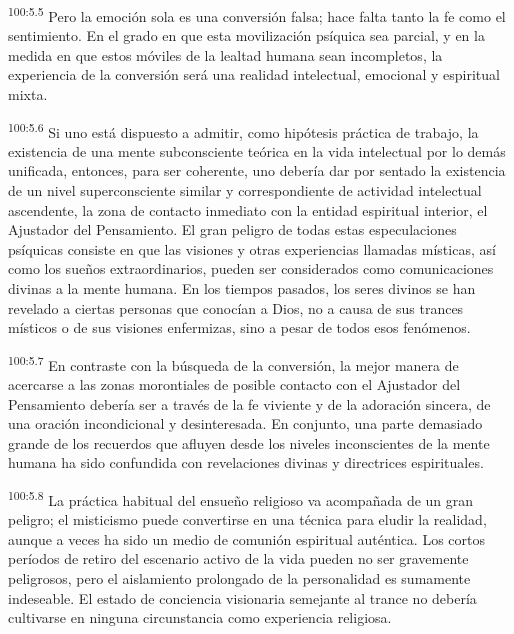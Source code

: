 \documentclass[twoside, 11pt]{book}
\begin{document}
\par
\textsuperscript{100:5.5} Pero la emoción sola es una conversión falsa; hace falta tanto la fe como el sentimiento. En el grado en que esta movilización psíquica sea parcial, y en la medida en que estos móviles de la lealtad humana sean incompletos, la experiencia de la conversión será una realidad intelectual, emocional y espiritual mixta.

\par
\textsuperscript{100:5.6} Si uno está dispuesto a admitir, como hipótesis práctica de trabajo, la existencia de una mente subconsciente teórica en la vida intelectual por lo demás unificada, entonces, para ser coherente, uno debería dar por sentado la existencia de un nivel superconsciente similar y correspondiente de actividad intelectual ascendente, la zona de contacto inmediato con la entidad espiritual interior, el Ajustador del Pensamiento. El gran peligro de todas estas especulaciones psíquicas consiste en que las visiones y otras experiencias llamadas místicas, así como los sueños extraordinarios, pueden ser considerados como comunicaciones divinas a la mente humana. En los tiempos pasados, los seres divinos se han revelado a ciertas personas que conocían a Dios, no a causa de sus trances místicos o de sus visiones enfermizas, sino a pesar de todos esos fenómenos.

\par
\textsuperscript{100:5.7} En contraste con la búsqueda de la conversión, la mejor manera de acercarse a las zonas morontiales de posible contacto con el Ajustador del Pensamiento debería ser a través de la fe viviente y de la adoración sincera, de una oración incondicional y desinteresada. En conjunto, una parte demasiado grande de los recuerdos que afluyen desde los niveles inconscientes de la mente humana ha sido confundida con revelaciones divinas y directrices espirituales.

\par
\textsuperscript{100:5.8} La práctica habitual del ensueño religioso va acompañada de un gran peligro; el misticismo puede convertirse en una técnica para eludir la realidad, aunque a veces ha sido un medio de comunión espiritual auténtica. Los cortos períodos de retiro del escenario activo de la vida pueden no ser gravemente peligrosos, pero el aislamiento prolongado de la personalidad es sumamente indeseable. El estado de conciencia visionaria semejante al trance no debería cultivarse en ninguna circunstancia como experiencia religiosa.
\end{document}
